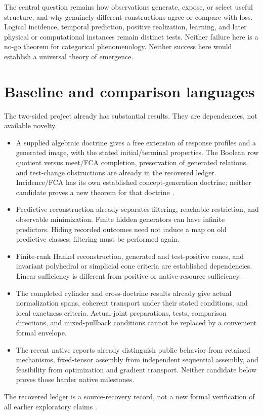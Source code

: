 \documentclass[11pt]{article}
\theoremstyle{remark}
\begin{document}
The central question remains how observations generate, expose, or select useful structure, and why genuinely different constructions agree or compare with loss. Logical incidence, temporal prediction, positive realization, learning, and later physical or computational instances remain distinct tests. Neither failure here is a no-go theorem for categorical phenomenology. Neither success here would establish a universal theory of emergence.

\section{Baseline and comparison languages}
\label{sec:baseline}

The two-sided project already has substantial results. They are dependencies, not available novelty.
\begin{itemize}
\item A supplied algebraic doctrine gives a free extension of response profiles and a generated image, with the stated initial/terminal properties. The Boolean row quotient versus meet/FCA completion, preservation of generated relations, and test-change obstructions are already in the recovered ledger. Incidence/FCA has its own established concept-generation doctrine; neither candidate proves a new theorem for that doctrine \cite{FCA}.
\item Predictive reconstruction already separates filtering, reachable restriction, and observable minimization. Finite hidden generators can have infinite predictors. Hiding recorded outcomes need not induce a map on old predictive classes; filtering must be performed again.
\item Finite-rank Hankel reconstruction, generated and test-positive cones, and invariant polyhedral or simplicial cone criteria are established dependencies. Linear sufficiency is different from positive or native-resource sufficiency.
\item The completed cylinder and cross-doctrine results already give actual normalization spans, coherent transport under their stated conditions, and local exactness criteria. Actual joint preparations, tests, comparison directions, and mixed-pullback conditions cannot be replaced by a convenient formal envelope.
\item The recent native reports already distinguish public behavior from retained mechanisms, fixed-tensor assembly from independent sequential assembly, and feasibility from optimization and gradient transport. Neither candidate below proves those harder native milestones.
\end{itemize}
The recovered ledger is a source-recovery record, not a new formal verification of all earlier exploratory claims \cite{Ledger,Contract}.
\end{document}
